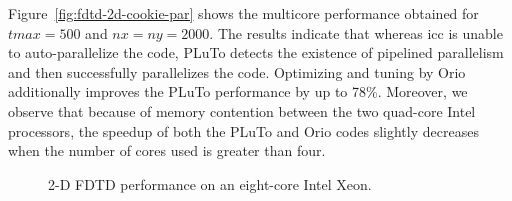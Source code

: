  
Figure~\ref{fig:fdtd-2d-cookie-par} shows the multicore performance obtained
for $tmax=500$ and $nx=ny=2000$. The results indicate that whereas icc is
unable to auto-parallelize the code, PLuTo detects the existence of pipelined
parallelism and then successfully parallelizes the code. Optimizing and
tuning by Orio additionally improves the PLuTo performance by up to
78\%. Moreover, we observe that because of memory contention between the two
quad-core Intel processors, the speedup of both the PLuTo and Orio codes
slightly decreases when the number of cores used is greater than four.
 
\begin{figure}[htb] 
\begin{center} 
    
\end{center}
\vspace{-.2in} 
\caption{2-D FDTD performance on an eight-core Intel Xeon.} 
\label{fig:fdtd-2d-cookie-results} 
\end{figure} 


